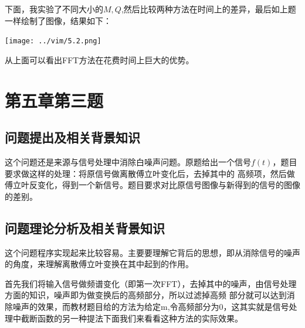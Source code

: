 \documentclass[10pt,a4paper]{ctexart}
\begin{document}
下面，我实验了不同大小的$M,Q$,然后比较两种方法在时间上的差异，最后如上题一样绘制了图像，结果如下：
\par
\centerline{\texttt{[image: ../vim/5.2.png]}}
\par
从上面可以看出FFT方法在花费时间上巨大的优势。
\section{第五章第三题}
\subsection{问题提出及相关背景知识}
这个问题还是来源与信号处理中消除白噪声问题。原题给出一个信号$f(t)$，题目要求做这样的处理：将原信号做离散傅立叶变化后，去掉其中的
高频项，然后做傅立叶反变化，得到一个新信号。题目要求对比原信号图像与新得到的信号的图像的差别。
\subsection{问题理论分析及相关背景知识}
这个问题程序实现起来比较容易。主要要理解它背后的思想，即从消除信号的噪声的角度，来理解离散傅立叶变换在其中起到的作用。

首先我们将输入信号做频谱变化（即第一次FFT），去掉其中的噪声，由信号处理方面的知识，噪声即为做变换后的高频部分，所以过滤掉高频
部分就可以达到消除噪声的效果，而教材题目给的方法为给定m,令高频部分为0，这其实就是信号处理中截断函数的另一种提法下面我们来看看这种方法的实际效果。
\end{document}
